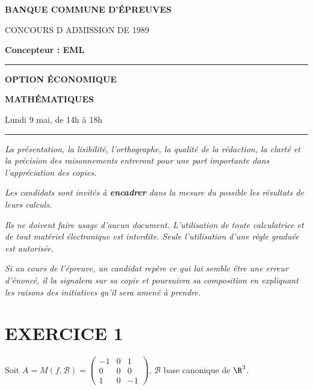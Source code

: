 \documentclass[11pt]{article}%
\begin{document}

\begin{center}
{\LARG\E\textbf{BANQUE COMMUNE D'ÉPREUVES}}



{\large \textsc{CONCOURS D ADMISSION DE 1989}}



{\large \textbf{Concepteur : EML}}



\rule{2.39cm}{0.05cm}



{\Large \textbf{OPTION ÉCONOMIQUE}}



{\Large \textbf{MATHÉMATIQUES }}



{\Large Lundi 9 mai, de 14h à 18h}



\rule{2.39cm}{0.05cm}
\end{center}

\textit{La présentation, la lisibilité, l'orthographe, la qualité
de la rédaction, la clarté et la précision des raisonnements
entreront pour une part importante dans l'appréciation des copies.}

\textit{Les candidats sont invités à \textbf{encadrer} dans la mesure
du possible les résultats de leurs calculs.}

\textit{Ils ne doivent faire usage d'aucun document. L'utilisation de
toute
calculatrice et de tout matériel électronique est interdite. Seule
l'utilisation d'une règle graduée est autorisée.}

\textit{Si au cours de l'épreuve, un candidat repère ce qui lui semble
être une erreur d'énoncé, il la signalera sur sa copie et
poursuivra sa composition en expliquant les raisons des initiatives
qu'il sera
amené à prendre.}

\vspace*{3cm}

\section*{EXERCICE 1}

Soit $A = M(f,\mathcal{B}) = \left( 
\begin{array}{ccc}
-1 & 0 & 1 \\
0 & 0 & 0 \\
1 & 0 & -1
\end{array}
\right) $, $\mathcal{B}$ base canonique de $\R^{3}$.
\end{document}
